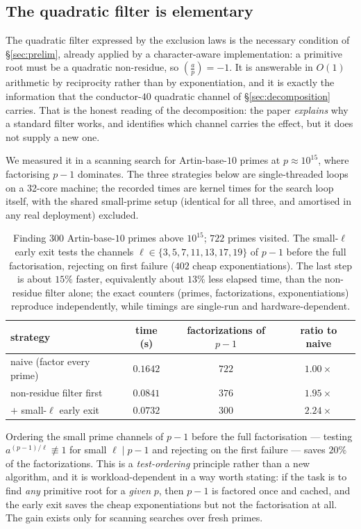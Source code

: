 \documentclass[11pt,reqno]{amsart}
\theoremstyle{plain}
\theoremstyle{definition}
\newcommand{\Lsym}[2]{\left(\tfrac{#1}{#2}\right)}
\begin{document}
\subsection*{The quadratic filter is elementary}
The quadratic filter expressed by the exclusion laws is the necessary condition of
\S\ref{sec:prelim}, already applied by a character-aware implementation: a primitive root
must be a quadratic non-residue, so $\Lsym{a}{p}=-1$. It is answerable in $O(1)$ arithmetic
by reciprocity rather than by exponentiation, and it is exactly the information that the
conductor-$40$ quadratic channel of \S\ref{sec:decomposition} carries. That is the honest reading
of the decomposition: the paper \emph{explains} why a standard filter works, and identifies which
channel carries the effect, but it does not supply a new one.

We measured it in a scanning search for Artin-base-$10$ primes at $p \approx 10^{15}$, where
factorising $p-1$ dominates. The three strategies below are single-threaded loops on a 32-core
machine; the recorded times are kernel times for the search loop itself, with the shared
small-prime setup (identical for all three, and amortised in any real deployment) excluded.

\begin{table}[t]
	\centering
	\begin{tabular}{lccc}
		\toprule
		strategy & time (s) & factorizations of $p-1$ & ratio to naive \\
		\midrule
		naive (factor every prime) & $0.1642$ & $722$ & $1.00\times$ \\
		non-residue filter first & $0.0841$ & $376$ & $1.95\times$ \\
		\quad $+$ small-$\ell$ early exit & $0.0732$ & $300$ & $2.24\times$ \\
		\bottomrule
	\end{tabular}
	\caption{Finding $300$ Artin-base-$10$ primes above $10^{15}$; $722$ primes visited. The
	small-$\ell$ early exit tests the channels $\ell \in \{3,5,7,11,13,17,19\}$ of $p-1$ before
	the full factorisation, rejecting on first failure ($402$ cheap exponentiations). The last
	step is about $15\%$ faster, equivalently about $13\%$ less elapsed time, than the
	non-residue filter alone; the exact counters (primes, factorizations, exponentiations)
	reproduce independently, while timings are single-run and hardware-dependent.}
	\label{tab:filter}
\end{table}

Ordering the small prime channels of $p-1$ before the full factorisation --- testing
$a^{(p-1)/\ell} \not\equiv 1$ for small $\ell \mid p-1$ and rejecting on the first failure ---
saves $20\%$ of the factorizations. This is a \emph{test-ordering} principle rather than a new
algorithm, and it is workload-dependent in a way worth stating: if the task is to find \emph{any}
primitive root for a \emph{given} $p$, then $p-1$ is factored once and cached, and the early exit
saves the cheap exponentiations but not the factorisation at all. The gain exists only for
scanning searches over fresh primes.
\end{document}
